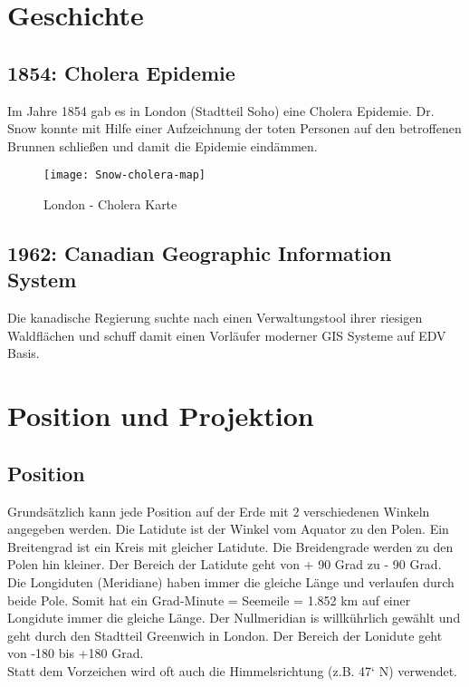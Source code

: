 \documentclass[11pt,fleqn]{book} %
\begin{document}
\chapter{Geschichte}

\section{1854: Cholera Epidemie}
Im Jahre 1854 gab es in London (Stadtteil Soho) eine Cholera Epidemie. Dr. Snow konnte mit Hilfe einer Aufzeichnung der toten Personen auf den betroffenen Brunnen schlie{\ss}en und damit die Epidemie eind\"ammen.

\begin{figure}[h]
\centering\texttt{[image: Snow-cholera-map]}
\caption{London - Cholera Karte}
\end{figure}

\section{1962: Canadian Geographic Information System}
Die kanadische Regierung suchte nach einen Verwaltungstool ihrer riesigen Waldfl\"achen und schuff damit einen Vorl\"aufer moderner GIS Systeme auf EDV Basis. 



\chapter{Position und Projektion}

\section{Position}
Grunds\"atzlich kann jede Position auf der Erde mit 2 verschiedenen Winkeln angegeben werden. Die Latidute ist der Winkel vom Aquator zu den Polen. 
Ein Breitengrad ist ein Kreis mit gleicher Latidute. Die Breidengrade werden zu den Polen hin kleiner. Der Bereich der Latidute geht von + 90 Grad zu - 90 Grad. \\
Die Longiduten (Meridiane) haben immer die gleiche L\"ange und verlaufen durch beide Pole. Somit hat ein Grad-Minute  = Seemeile = 1.852 km auf einer Longidute immer die gleiche L\"ange. Der Nullmeridian is willk\"uhrlich gew\"ahlt und geht durch den Stadtteil Greenwich in London. Der Bereich der Lonidute geht von -180 bis +180 Grad. \\
Statt dem Vorzeichen wird oft auch die Himmelsrichtung (z.B. 47` N) verwendet.   
 
\end{document}

